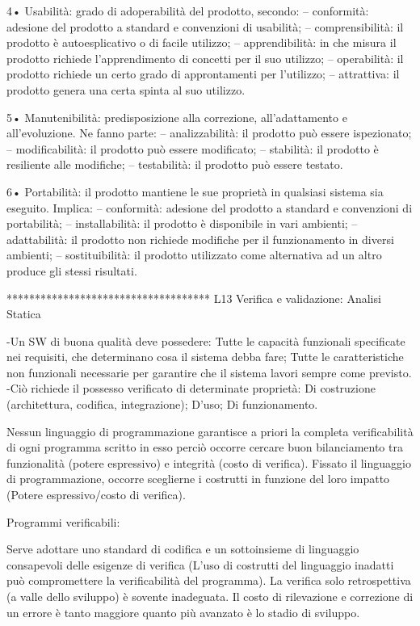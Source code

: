 \documentclass{report}
\begin{document}
4• Usabilità: grado di adoperabilità del prodotto, secondo:
– conformità: adesione del prodotto a standard e convenzioni di usabilità;
– comprensibilità: il prodotto è autoesplicativo o di facile utilizzo;
– apprendibilità: in che misura il prodotto richiede l’apprendimento di concetti per il suo utilizzo;
– operabilità: il prodotto richiede un certo grado di approntamenti per l’utilizzo;
– attrattiva: il prodotto genera una certa spinta al suo utilizzo.

5• Manutenibilità: predisposizione alla correzione, all’adattamento e all’evoluzione. Ne fanno parte:
– analizzabilità: il prodotto può essere ispezionato;
– modificabilità: il prodotto può essere modificato;
– stabilità: il prodotto è resiliente alle modifiche;
– testabilità: il prodotto può essere testato.

6• Portabilità: il prodotto mantiene le sue proprietà in qualsiasi sistema sia eseguito. Implica:
– conformità: adesione del prodotto a standard e convenzioni di portabilità;
– installabilità: il prodotto è disponibile in vari ambienti;
– adattabilità: il prodotto non richiede modifiche per il funzionamento in diversi ambienti;
– sostituibilità: il prodotto utilizzato come alternativa ad un altro produce gli stessi risultati.

************************************
L13 Verifica e validazione: Analisi Statica

-Un SW di buona qualità deve possedere:
Tutte le capacità funzionali specificate nei requisiti, che determinano cosa il sistema debba fare;
Tutte le caratteristiche non funzionali necessarie per garantire che il sistema lavori sempre come previsto.
-Ciò richiede il possesso verificato di determinate proprietà:
Di costruzione (architettura, codifica, integrazione); D’uso; Di funzionamento.

Nessun linguaggio di programmazione garantisce a priori la completa verificabilità di ogni programma scritto in esso perciò occorre cercare buon bilanciamento tra funzionalità (potere espressivo) e integrità (costo di verifica).
Fissato il linguaggio di programmazione, occorre sceglierne i costrutti in funzione del loro impatto (Potere espressivo/costo di verifica).

Programmi verificabili: 

Serve adottare uno standard di codifica e un sottoinsieme di linguaggio consapevoli delle esigenze di verifica (L’uso di costrutti del linguaggio inadatti può compromettere la verificabilità del programma).
La verifica solo retrospettiva (a valle dello sviluppo) è sovente inadeguata. Il costo di rilevazione e correzione di un errore è tanto maggiore quanto più avanzato è lo stadio di sviluppo.
\end{document}
